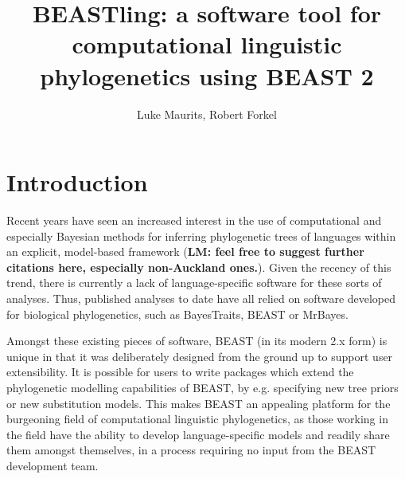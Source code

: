 \documentclass[twocolumn,10pt]{scrartcl}
\begin{document}
\title{BEASTling: a software tool for computational linguistic phylogenetics using BEAST 2}
\author{Luke Maurits, Robert Forkel}
\maketitle


\section{Introduction}

Recent years have seen an increased interest in the use of computational and especially Bayesian methods for inferring phylogenetic trees of languages within an explicit, model-based framework \citep[e.g.,][]{Gray2003,Gray2009,Bouckaert2012} (\textbf{LM: feel free to suggest further citations here, especially non-Auckland ones.}).  Given the recency of this trend, there is currently a lack of language-specific software for these sorts of analyses.  Thus, published analyses to date have all relied on software developed for biological phylogenetics, such as BayesTraits, BEAST\cite{Drummond2012,Bouckaert2014} or MrBayes\cite{Huelsenbeck2001, Ronquist2003}.

Amongst these existing pieces of software, BEAST (in its modern 2.x form) is unique in that it was deliberately designed from the ground up to support user extensibility.  It is possible for users to write packages which extend the phylogenetic modelling capabilities of BEAST, by e.g. specifying new tree priors or new substitution models.  This makes BEAST an appealing platform for the burgeoning field of computational linguistic phylogenetics, as those working in the field have the ability to develop language-specific models and readily share them amongst themselves, in a process requiring no input from the BEAST development team.
\end{document}
